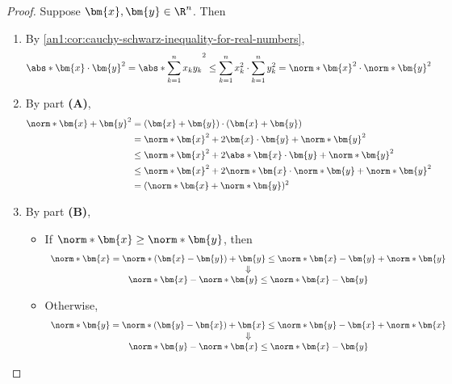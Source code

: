 \begin{proof}
  Suppose $\bm{x}, \bm{y} \in \R^{n}$. Then
  \begin{enumerate}[label=\textbf{(\Alph*)}]
    \item By \cref{an1:cor:cauchy-schwarz-inequality-for-real-numbers},
          \[
            \abs*{\bm{x} \cdot \bm{y}}^{2} = \abs*{\sum_{k = 1}^{n} x_{k}y_{k}}^{2} \leq
            \sum_{k = 1}^{n} x_{k}^{2} \cdot \sum_{k = 1}^{n} y_{k}^{2}
            = \norm*{\bm{x}}^{2} \cdot \norm*{\bm{y}}^{2}
          \]
    \item By part \textbf{(A)},
          \begin{align*}
            \norm*{\bm{x} + \bm{y}}^{2}
             & = (\bm{x} + \bm{y}) \cdot (\bm{x} + \bm{y})                                         \\
             & = \norm*{\bm{x}}^{2} + 2\bm{x} \cdot \bm{y} + \norm*{\bm{y}}^{2}                    \\
             & \leq \norm*{\bm{x}}^{2} + 2\abs*{\bm{x} \cdot \bm{y}} + \norm*{\bm{y}}^{2}          \\
             & \leq \norm*{\bm{x}}^{2} + 2\norm*{\bm{x}} \cdot \norm*{\bm{y}} + \norm*{\bm{y}}^{2} \\
             & = (\norm*{\bm{x}} + \norm*{\bm{y}})^{2}
          \end{align*}
    \item By part \textbf{(B)},
          \begin{itemize}
            \item If $\norm*{\bm{x}} \geq \norm*{\bm{y}}$, then
                  \[
                    \begin{array}{c}
                      \norm*{\bm{x}} = \norm*{(\bm{x} - \bm{y}) + \bm{y}}
                      \leq \norm*{\bm{x} - \bm{y}} + \norm*{\bm{y}} \\
                      \Downarrow                                    \\
                      \norm*{\bm{x}} - \norm*{\bm{y}} \leq \norm*{\bm{x} - \bm{y}}
                    \end{array}
                  \]
            \item Otherwise,
                  \[
                    \begin{array}{c}
                      \norm*{\bm{y}} = \norm*{(\bm{y} - \bm{x}) + \bm{x}}
                      \leq \norm*{\bm{y} - \bm{x}} + \norm*{\bm{x}} \\
                      \Downarrow                                    \\
                      \norm*{\bm{y}} - \norm*{\bm{x}} \leq \norm*{\bm{x} - \bm{y}}
                    \end{array}
                  \]
          \end{itemize}
  \end{enumerate}
\end{proof}
